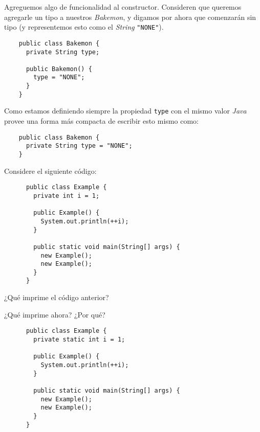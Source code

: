   Agreguemos algo de funcionalidad al constructor.
  Consideren que queremos agregarle un tipo a nuestros \textit{Bakemon}, y digamos por ahora que 
  comenzarán sin tipo (y representemos esto como el \textit{String} \texttt{"NONE"}).

  \begin{verbatim}
    public class Bakemon {
      private String type;

      public Bakemon() {
        type = "NONE";
      }
    }
  \end{verbatim}

  Como estamos definiendo siempre la propiedad \texttt{type} con el mismo valor \textit{Java} provee
  una forma más compacta de escribir esto mismo como:

  \begin{verbatim}
    public class Bakemon {
      private String type = "NONE";
    }
  \end{verbatim}

  \begin{exercise}
    Considere el siguiente código:

    \begin{verbatim}
      public class Example {
        private int i = 1;

        public Example() {
          System.out.println(++i);
        }

        public static void main(String[] args) {
          new Example();
          new Example();
        }
      }
    \end{verbatim}

    ¿Qué imprime el código anterior?
  \end{exercise}

  \begin{exercise}
    ¿Qué imprime ahora? ¿Por qué?

    \begin{verbatim}
      public class Example {
        private static int i = 1;

        public Example() {
          System.out.println(++i);
        }

        public static void main(String[] args) {
          new Example();
          new Example();
        }
      }
    \end{verbatim}
  \end{exercise}